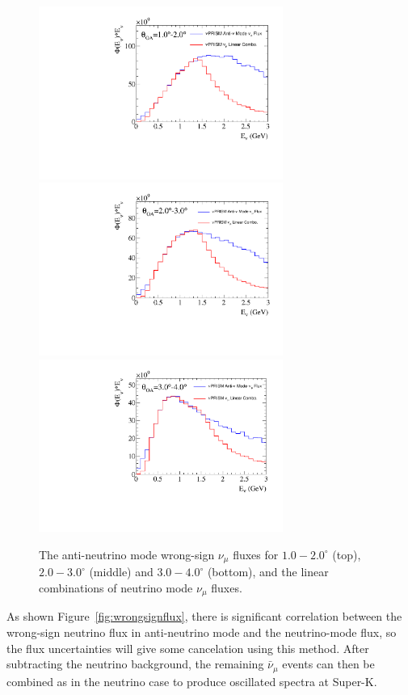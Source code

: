 \begin{figure}[htpb]
\begin{center}
      \includegraphics[width=8cm] {figures/nuprism_numu_ws_fit_1to2.pdf}
      \includegraphics[width=8cm] {figures/nuprism_numu_ws_fit_2to3.pdf}
      \includegraphics[width=8cm] {figures/nuprism_numu_ws_fit_3to4.pdf}
\end{center}
\caption{The \nuprism anti-neutrino mode wrong-sign $\nu_{\mu}$ fluxes for $1.0-2.0^{\circ}$ (top), $2.0-3.0^{\circ}$ (middle) and $3.0-4.0^{\circ}$ (bottom), and the \nuprism linear combinations of neutrino mode $\nu_{\mu}$ fluxes.  }
\label{fig:wrongsignfit}
\end{figure}

As shown Figure~\ref{fig:wrongsignflux}, there is significant correlation between the wrong-sign neutrino flux in anti-neutrino mode and the neutrino-mode flux, so the flux uncertainties will give some cancelation using this method. After subtracting the neutrino background, the remaining $\bar{\nu}_\mu$ events can 
then be combined as in the neutrino case to produce oscillated spectra at Super-K. 

